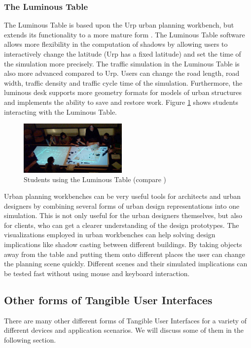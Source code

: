 \subsubsection{The Luminous Table}
The Luminous Table is based upon the Urp urban planning workbench, but extends its functionality to a more mature form \cite{ishii02}. The Luminous Table software allows more flexibility in the computation of shadows by allowing users to interactively change the latitude (Urp has a fixed latitude) and set the time of the simulation more precisely. The traffic simulation in the Luminous Table is also more advanced compared to Urp. Users can change the road length, road width, traffic density and traffic cycle time of the simulation. Furthermore, the luminous desk supports more geometry formats for models of urban structures and implements the ability to save and restore work. Figure \ref{fig:luminous_table} shows students interacting with the Luminous Table.

\begin{figure}
\centering
\includegraphics[width=0.47\textwidth]{figures/luminous_table.pdf}
\caption{Students using the Luminous Table (compare \protect\cite{ishii02})}
\label{fig:luminous_table}
\end{figure}

Urban planning workbenches can be very useful tools for architects and urban designers by combining several forms of urban design representations into one simulation. This is not only useful for the urban designers themselves, but also for clients, who can get a clearer understanding of the design prototypes. The visualizations employed in urban workbenches can help solving design implications like shadow casting between different buildings. By taking objects away from the table and putting them onto different places the user can change the planning scene quickly. Different scenes and their simulated implications can be tested fast without using mouse and keyboard interaction.

\subsection {Other forms of Tangible User Interfaces}
There are many other different forms of Tangible User Interfaces for a variety of different devices and application scenarios. We will discuss some of them in the following section. 

